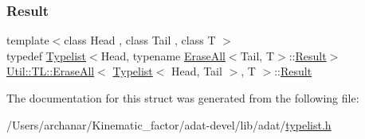 \mbox{\label{structUtil_1_1TL_1_1EraseAll_3_01Typelist_3_01Head_00_01Tail_01_4_00_01T_01_4_aa724903cc91ed9eea3da277857c8f5aa}} 
\subsubsection{\texorpdfstring{Result}{Result}\hspace{0.1cm}{\footnotesize\ttfamily [3/3]}}
{\footnotesize\ttfamily template$<$class Head , class Tail , class T $>$ \\
typedef \mbox{\hyperlink{structUtil_1_1Typelist}{Typelist}}$<$Head, typename \mbox{\hyperlink{structUtil_1_1TL_1_1EraseAll}{Erase\+All}}$<$Tail, T$>$\+::\mbox{\hyperlink{structUtil_1_1TL_1_1EraseAll_3_01Typelist_3_01Head_00_01Tail_01_4_00_01T_01_4_aa724903cc91ed9eea3da277857c8f5aa}{Result}}$>$ \mbox{\hyperlink{structUtil_1_1TL_1_1EraseAll}{Util\+::\+T\+L\+::\+Erase\+All}}$<$ \mbox{\hyperlink{structUtil_1_1Typelist}{Typelist}}$<$ Head, Tail $>$, T $>$\+::\mbox{\hyperlink{structUtil_1_1TL_1_1EraseAll_3_01Typelist_3_01Head_00_01Tail_01_4_00_01T_01_4_aa724903cc91ed9eea3da277857c8f5aa}{Result}}}



The documentation for this struct was generated from the following file\+:\begin{DoxyCompactItemize}
\item 
/\+Users/archanar/\+Kinematic\+\_\+factor/adat-\/devel/lib/adat/\mbox{\hyperlink{adat-devel_2lib_2adat_2typelist_8h}{typelist.\+h}}\end{DoxyCompactItemize}
